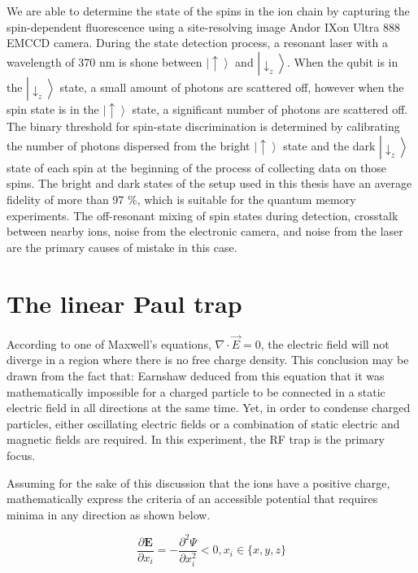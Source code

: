 We are able to determine the state of the spins in the ion chain by capturing the spin-dependent fluorescence using a site-resolving image Andor IXon Ultra 888 EMCCD camera. During the state detection process, a resonant laser with a wavelength of 370 nm is shone between $\left|\uparrow\right\rangle$ and $\left|\downarrow_z\right\rangle$. When the qubit is in the $\left|\downarrow_z\right\rangle$ state, a small amount of photons are scattered off, however when the spin state is in the $\left|\uparrow\right\rangle$ state, a significant number of photons are scattered off. The binary threshold for spin-state discrimination is determined by calibrating the number of photons dispersed from the bright $\left|\uparrow\right\rangle$ state and the dark $\left|\downarrow_z\right\rangle$ state of each spin at the beginning of the process of collecting data on those spins. The bright and dark states of the setup used in this thesis have an average fidelity of more than 97 \%, which is suitable for the quantum memory experiments. The off-resonant mixing of spin states during detection, crosstalk between nearby ions, noise from the electronic camera, and noise from the laser are the primary causes of mistake in this case.


\section{The linear Paul trap}

According to one of Maxwell's equations, $\nabla \cdot \vec{E}=0$, the electric field will not diverge in a region where there is no free charge density. This conclusion may be drawn from the fact that: Earnshaw deduced from this equation that it was mathematically impossible for a charged particle to be connected in a static electric field in all directions at the same time. Yet, in order to condense charged particles, either oscillating electric fields or a combination of static electric and magnetic fields are required. In this experiment, the RF trap is the primary focus.

Assuming for the sake of this discussion that the ions have a positive charge, mathematically express the criteria of an accessible potential that requires minima in any direction as shown below.

\begin{equation}\label{eq:minima}
    \frac{\partial \mathbf{E}}{\partial x_i}=-\frac{\partial^2 \Psi}{\partial x_i^2}<0, x_i \in\{x, y, z\}
\end{equation}


